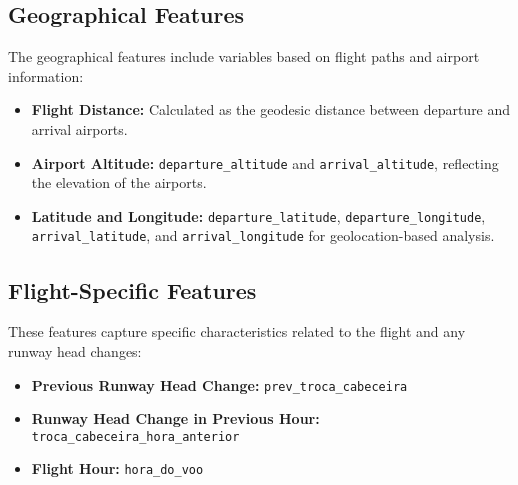 \subsection{Geographical Features}
The geographical features include variables based on flight paths and airport information:

\begin{itemize}
    \item \textbf{Flight Distance:} Calculated as the geodesic distance between departure and arrival airports.
    \item \textbf{Airport Altitude:} \texttt{departure\_altitude} and \texttt{arrival\_altitude}, reflecting the elevation of the airports.
    \item \textbf{Latitude and Longitude:} \texttt{departure\_latitude}, \texttt{departure\_longitude}, \texttt{arrival\_latitude}, and \texttt{arrival\_longitude} for geolocation-based analysis.
\end{itemize}

\subsection{Flight-Specific Features}
These features capture specific characteristics related to the flight and any runway head changes:

\begin{itemize}
    \item \textbf{Previous Runway Head Change:} \texttt{prev\_troca\_cabeceira}
    \item \textbf{Runway Head Change in Previous Hour:} \texttt{troca\_cabeceira\_hora\_anterior}
    \item \textbf{Flight Hour:} \texttt{hora\_do\_voo}
\end{itemize}



